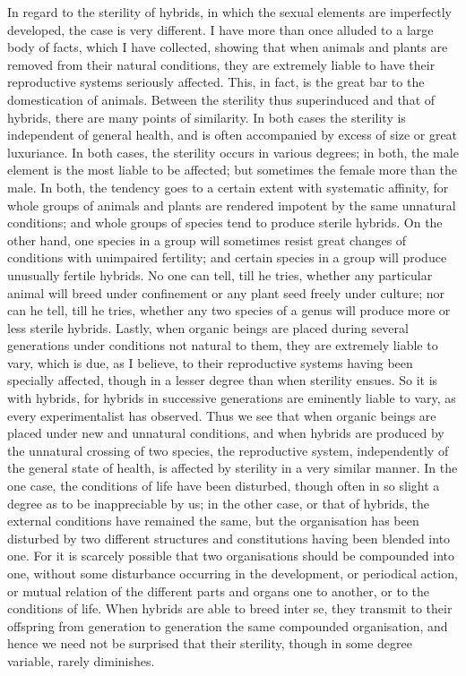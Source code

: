 In regard to the sterility of hybrids, in which the sexual elements are imperfectly developed, the case is very different. I have more than once alluded to a large body of facts, which I have collected, showing that when animals and plants are removed from their natural conditions, they are extremely liable to have their reproductive systems seriously affected. This, in fact, is the great bar to the domestication of animals. Between the sterility thus superinduced and that of hybrids, there are many points of similarity. In both cases the sterility is independent of general health, and is often accompanied by excess of size or great luxuriance. In both cases, the sterility occurs in various degrees; in both, the male element is the most liable to be affected; but sometimes the female more than the male. In both, the tendency goes to a certain extent with systematic affinity, for whole groups of animals and plants are rendered impotent by the same unnatural conditions; and whole groups of species tend to produce sterile hybrids. On the other hand, one species in a group will sometimes resist great changes of conditions with unimpaired fertility; and certain species in a group will produce unusually fertile hybrids. No one can tell, till he tries, whether any particular animal will breed under confinement or any plant seed freely under culture; nor can he tell, till he tries, whether any two species of a genus will produce more or less sterile hybrids. Lastly, when organic beings are placed during several generations under conditions not natural to them, they are extremely liable to vary, which is due, as I believe, to their reproductive systems having been specially affected, though in a lesser degree than when sterility ensues. So it is with hybrids, for hybrids in successive generations are eminently liable to vary, as every experimentalist has observed.
Thus we see that when organic beings are placed under new and unnatural conditions, and when hybrids are produced by the unnatural crossing of two species, the reproductive system, independently of the general state of health, is affected by sterility in a very similar manner. In the one case, the conditions of life have been disturbed, though often in so slight a degree as to be inappreciable by us; in the other case, or that of hybrids, the external conditions have remained the same, but the organisation has been disturbed by two different structures and constitutions having been blended into one. For it is scarcely possible that two organisations should be compounded into one, without some disturbance occurring in the development, or periodical action, or mutual relation of the different parts and organs one to another, or to the conditions of life. When hybrids are able to breed inter se, they transmit to their offspring from generation to generation the same compounded organisation, and hence we need not be surprised that their sterility, though in some degree variable, rarely diminishes.
